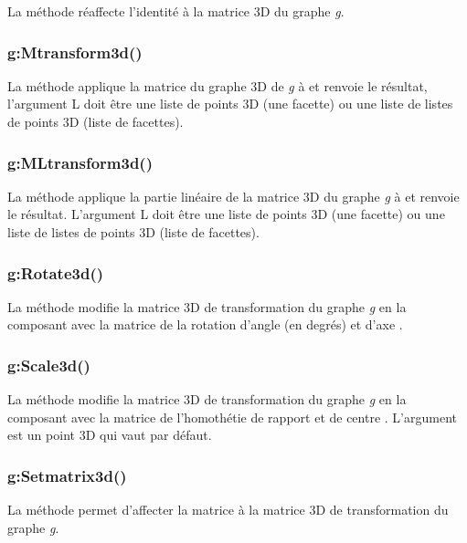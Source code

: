 La méthode  réaffecte l'identité à la matrice 3D du graphe \emph g.

\subsubsection{g:Mtransform3d()}

La méthode  applique la matrice du graphe 3D de \emph g à  et renvoie le résultat, l'argument \argu L doit être une liste de points 3D (une facette) ou une liste de listes de points 3D (liste de facettes).

\subsubsection{g:MLtransform3d()}

La méthode  applique la partie linéaire de la matrice 3D du graphe \emph g à  et renvoie le résultat. L'argument \argu L doit être une liste de points 3D (une facette) ou une liste de listes de points 3D (liste de facettes).

\subsubsection{g:Rotate3d()}

La méthode  modifie la matrice 3D de transformation du graphe \emph g en la composant avec la matrice de la rotation d'angle  (en degrés) et d'axe . 

\subsubsection{g:Scale3d()}

La méthode  modifie la matrice 3D de transformation du graphe \emph g en la composant avec la matrice de l'homothétie de rapport  et de centre . L'argument  est un point 3D qui vaut  par défaut.


\subsubsection{g:Setmatrix3d()}

La méthode  permet d'affecter la matrice  à la matrice 3D de transformation du graphe \emph g.

